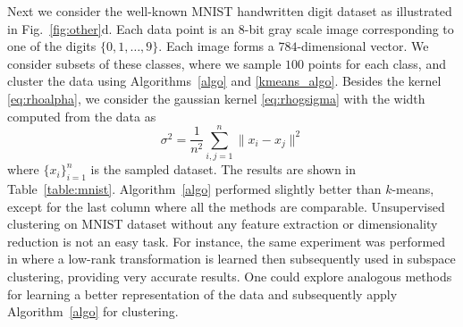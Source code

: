 \documentclass[aps,preprint,nofootinbib,floatfix]{revtex4-1}
\begin{document}
Next we consider 
the well-known MNIST handwritten digit dataset 
as illustrated in Fig.~\ref{fig:other}d.
Each data point is an $8$-bit gray scale
image corresponding to one of the digits $\{0,1,\dotsc,9 \}$.
Each image forms a $784$-dimensional vector.
We consider subsets of these classes, where we sample $100$ points 
for each class, and cluster the data using Algorithms~\ref{algo} and
\ref{kmeans_algo}. Besides the kernel \eqref{eq:rhoalpha}, we
consider the gaussian kernel \eqref{eq:rhogsigma} with the width
computed from the data as
\begin{equation}
\label{eq:sigma}
\sigma^2 = \dfrac{1}{n^2} \sum_{i,j=1}^n \| x_i - x_j \|^2
\end{equation}
where $\{ x_i \}_{i=1}^n$ is the sampled dataset.
The results are shown in Table~\ref{table:mnist}.
Algorithm~\ref{algo} performed slightly better than $k$-means, except
for the last column where all the methods are comparable. 
Unsupervised clustering on MNIST dataset without any feature extraction
or dimensionality reduction is not an easy task. For instance,
the same experiment was performed in \cite{Sapiro} where a low-rank
transformation is learned then subsequently used in subspace clustering,
providing very accurate results. One could explore analogous methods
for learning a better representation of the data and subsequently apply
Algorithm~\ref{algo} for clustering.
\end{document}
